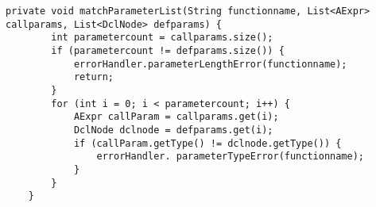 \begin{lstlisting}[caption={Private helper method for verifying function parameters in FuncStructureVisitor}, label={matchParameterList}]
    private void matchParameterList(String functionname, List<AExpr> callparams, List<DclNode> defparams) {
        int parametercount = callparams.size();
        if (parametercount != defparams.size()) {
            errorHandler.parameterLengthError(functionname);
            return;
        }
        for (int i = 0; i < parametercount; i++) {
            AExpr callParam = callparams.get(i);
            DclNode dclnode = defparams.get(i);
            if (callParam.getType() != dclnode.getType()) {
                errorHandler. parameterTypeError(functionname);
            }
        }
    }
\end{lstlisting}